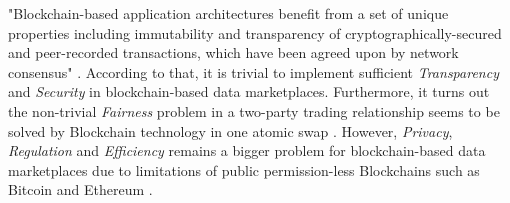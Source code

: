 

"Blockchain-based application architectures benefit from a set of unique properties including immutability and transparency of cryptographically-secured and peer-recorded transactions, which have been agreed upon by network consensus" \cite{eberhardtBlockchainInsightsOffChaining2017}. According to that, it is trivial to implement sufficient \emph{Transparency} and \emph{Security} in blockchain-based data marketplaces. Furthermore, it turns out the non-trivial \emph{Fairness} problem in a two-party trading relationship seems to be solved by Blockchain technology in one atomic swap \cite{dziembowskiFairSwapHowFairly2018,liZKCPlusOptimizedFairexchange2021}. However, \emph{Privacy}, \emph{Regulation} and \emph{Efficiency} remains a bigger problem for blockchain-based data marketplaces due to limitations of public permission-less Blockchains such as Bitcoin \cite{nakamotoBitcoinPeertoPeerElectronic} and Ethereum \cite{buterinNEXTGENERATIONSMART}.


